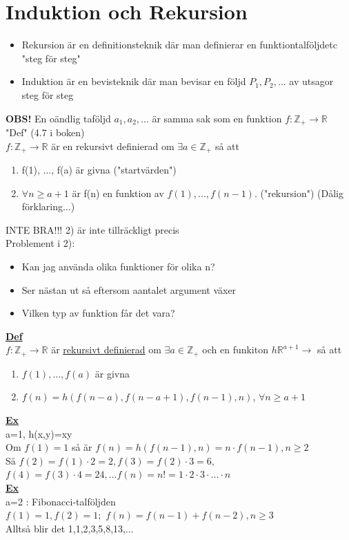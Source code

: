 \documentclass{article}
\begin{document}
    \section{Induktion och Rekursion}
        \begin{itemize}
            \item Rekursion är en definitionsteknik där man definierar en funktion\/talföljd\/etc "steg för steg"
            \item Induktion är en bevisteknik där man bevisar en följd $ P_{1}, P_{2}, ... $ av utsagor steg för steg
        \end{itemize}
        {\bf OBS!} En oändlig taföljd $ a_{1}, a_{2}, ... $ är samma sak som en funktion $ f:\mathbb{Z}_{+} \rightarrow \mathbb{R} $\\
        "Def" (4.7 i boken)\\
        $ f:\mathbb{Z}_{+} \rightarrow \mathbb{R} $ är en rekursivt definierad om $ \exists a\in \mathbb{Z}_{+} $ så att 
        \begin{enumerate}
            \item f(1), ..., f(a) är givna ("startvärden")
            \item $ \forall n\geq a+1$ är f(n) en funktion av $ f(1), ..., f(n-1) $. ("rekursion") (Dålig förklaring...)
        \end{enumerate}
        INTE BRA!!! 2) är inte tillräckligt precis\\
        Problement i 2):
        \begin{itemize}
            \item Kan jag använda olika funktioner för olika n?
            \item Ser nästan ut så eftersom aantalet argument växer
            \item Vilken typ av funktion får det vara?
        \end{itemize}
        \underline{{\bf Def}}\\
        $ f:\mathbb{Z}_{+} \rightarrow \mathbb{R} $ är \underline{rekursivt definierad} om $ \exists a\in \mathbb{Z}_{+} $
        och en funkiton $ h \mathbb{R}^{a+1} \rightarrow $ så att
        \begin{enumerate}
            \item $ f(1), ..., f(a) $ är givna
            \item $ f(n) = h(f(n-a), f(n-a+1), f(n-1), n) $, $ \forall n \geq a+1 $
        \end{enumerate}
        \underline{\textbf{Ex}}\\
        \indent a=1, h(x,y)=xy\\
        \indent Om $f(1)=1$ så är $f(n)=h(f(n-1), n) = n \cdot f(n-1), n \geq 2$\\
        \indent Så $f(2)=f(1)\cdot 2=2, f(3)=f(2)\cdot 3=6,$\\
        \indent $f(4)=f(3)\cdot 4=24,... f(n)=n!=1\cdot 2\cdot 3\cdot ... \cdot n$\\
        \underline{\textbf{Ex}}\\
        \indent a=2 : Fibonacci-talföljden\\
        \indent $f(1)=1, f(2)=1 ;$
        \indent $f(n)=f(n-1)+f(n-2), n\geq 3$\\
        \indent Alltså blir det 1,1,2,3,5,8,13,...
\end{document}
